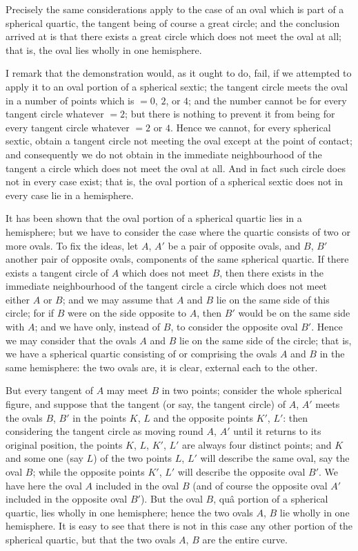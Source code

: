 \documentclass[11pt]{article}
\begin{document}
Precisely the same considerations apply to the case of an oval which is part of a spherical quartic, the tangent being of course a great circle; and the conclusion arrived at is that there exists a great circle which does not meet the oval at all; that is, the oval lies wholly in one hemisphere.

I remark that the demonstration would, as it ought to do, fail, if we attempted to apply it to an oval portion of a spherical sextic; the tangent circle meets the oval in a number of points which is $=0$, $2$, or $4$; and the number cannot be for every tangent circle whatever $=2$; but there is nothing to prevent it from being for every tangent circle whatever $=2$ or $4$. Hence we cannot, for every spherical sextic, obtain a tangent circle not meeting the oval except at the point of contact; and consequently we do not obtain in the immediate neighbourhood of the tangent a circle which does not meet the oval at all. And in fact such circle does not in every case exist; that is, the oval portion of a spherical sextic does not in every case lie in a hemisphere.

It has been shown that the oval portion of a spherical quartic lies in a hemisphere; but we have to consider the case where the quartic consists of two or more ovals. To fix the ideas, let $A$, $A'$ be a pair of opposite ovals, and $B$, $B'$ another pair of opposite ovals, components of the same spherical quartic. If there exists a tangent circle of $A$ which does not meet $B$, then there exists in the immediate neighbourhood of the tangent circle a circle which does not meet either $A$ or $B$; and we may assume that $A$ and $B$ lie on the same side of this circle; for if $B$ were on the side opposite to $A$, then $B'$ would be on the same side with $A$; and we have only, instead of $B$, to consider the opposite oval $B'$. Hence we may consider that the ovals $A$ and $B$ lie on the same side of the circle; that is, we have a spherical quartic consisting of or comprising the ovals $A$ and $B$ in the same hemisphere: the two ovals are, it is clear, external each to the other.

But every tangent of $A$ may meet $B$ in two points; consider the whole spherical figure, and suppose that the tangent (or say, the tangent circle) of $A$, $A'$ meets the ovals $B$, $B'$ in the points $K$, $L$ and the opposite points $K'$, $L'$: then considering the tangent circle as moving round $A$, $A'$ until it returns to its original position, the points $K$, $L$, $K'$, $L'$ are always four distinct points; and $K$ and some one (say $L$) of the two points $L$, $L'$ will describe the same oval, say the oval $B$; while the opposite points $K'$, $L'$ will describe the opposite oval $B'$. We have here the oval $A$ included in the oval $B$ (and of course the opposite oval $A'$ included in the opposite oval $B'$). But the oval $B$, qu\^a portion of a spherical quartic, lies wholly in one hemisphere; hence the two ovals $A$, $B$ lie wholly in one hemisphere. It is easy to see that there is not in this case any other portion of the spherical quartic, but that the two ovals $A$, $B$ are the entire curve.
\end{document}
